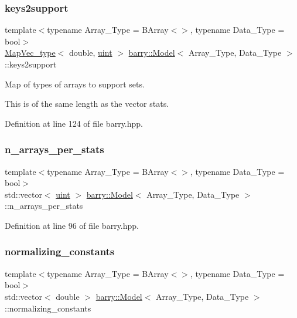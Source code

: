 \subsubsection{\texorpdfstring{keys2support}{keys2support}}
{\footnotesize\ttfamily template$<$typename Array\+\_\+\+Type  = B\+Array$<$$>$, typename Data\+\_\+\+Type  = bool$>$ \\
\hyperlink{namespacebarry_a2f0d3aab1d67e4c8eaeab9022e16139f}{Map\+Vec\+\_\+type}$<$ double, \hyperlink{namespacebarry_a11dfc53ddb4672278319aa04f1e09a6c}{uint} $>$ \hyperlink{classbarry_1_1_model}{barry\+::\+Model}$<$ Array\+\_\+\+Type, Data\+\_\+\+Type $>$\+::keys2support}



Map of types of arrays to support sets. 

This is of the same length as the vector {\ttfamily stats}. 

Definition at line 124 of file barry.\+hpp.

\mbox{\label{classbarry_1_1_model_a0c69ecef1b6633aec9f95f360a8baeaf}} 
\subsubsection{\texorpdfstring{n\+\_\+arrays\+\_\+per\+\_\+stats}{n\_arrays\_per\_stats}}
{\footnotesize\ttfamily template$<$typename Array\+\_\+\+Type  = B\+Array$<$$>$, typename Data\+\_\+\+Type  = bool$>$ \\
std\+::vector$<$ \hyperlink{namespacebarry_a11dfc53ddb4672278319aa04f1e09a6c}{uint} $>$ \hyperlink{classbarry_1_1_model}{barry\+::\+Model}$<$ Array\+\_\+\+Type, Data\+\_\+\+Type $>$\+::n\+\_\+arrays\+\_\+per\+\_\+stats}



Definition at line 96 of file barry.\+hpp.

\mbox{\label{classbarry_1_1_model_a4bf380231afbb968d977f0e0dc5f5bee}} 
\subsubsection{\texorpdfstring{normalizing\+\_\+constants}{normalizing\_constants}}
{\footnotesize\ttfamily template$<$typename Array\+\_\+\+Type  = B\+Array$<$$>$, typename Data\+\_\+\+Type  = bool$>$ \\
std\+::vector$<$ double $>$ \hyperlink{classbarry_1_1_model}{barry\+::\+Model}$<$ Array\+\_\+\+Type, Data\+\_\+\+Type $>$\+::normalizing\+\_\+constants}



